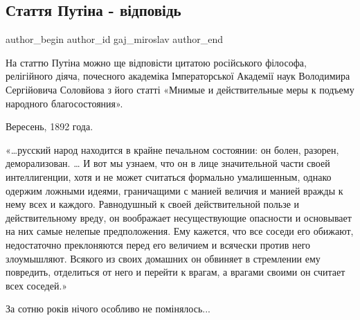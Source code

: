  
 
 
 
 
 
\subsection{Стаття Путіна - відповідь}
\label{sec:01_08_2021.fb.gaj_miroslav.1.statja_putin_otvet}
 
\ifcmt
 author_begin
   author_id gaj_miroslav
 author_end
\fi

На статтю Путіна можно ще відповісти цитатою російського філософа, релігійного
діяча, почесного академіка Імператорської Академії наук Володимира Сергійовича
Соловйова з його статті «Мнимые и действительные меры к подъему народного
благосостояния». 

Вересень, 1892 года. 

«…русский народ находится в крайне печальном состоянии: он болен, разорен,
деморализован. … И вот мы узнаем, что он в лице значительной части своей
интеллигенции, хотя и не может считаться формально умалишенным, однако одержим
ложными идеями, граничащими с манией величия и манией вражды к нему всех и
каждого. Равнодушный к своей действительной пользе и действительному вреду, он
воображает несуществующие опасности и основывает на них самые нелепые
предположения. Ему кажется, что все соседи его обижают, недостаточно
преклоняются перед его величием и всячески против него злоумышляют. Всякого из
своих домашних он обвиняет в стремлении ему повредить, отделиться от него и
перейти к врагам, а врагами своими он считает всех соседей.»

За сотню років нічого особливо не помінялось...


